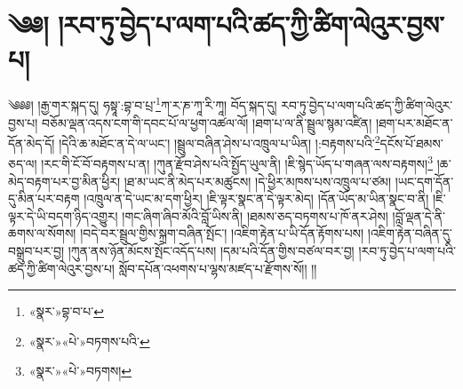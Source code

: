 \chapter{༄༅། །རབ་ཏུ་བྱེད་པ་ལག་པའི་ཚད་ཀྱི་ཚིག་ལེའུར་བྱས་པ།}༄༅༅། །རྒྱ་གར་སྐད་དུ། ཧསྟཱ་:བྷ་བ་པྲ་\footnote{«སྣར་»བྷ་བ་པ་}ཀ་ར་ཎ་ཀཱ་རི་ཀཱ། བོད་སྐད་དུ། རབ་ཏུ་བྱེད་པ་ལག་པའི་ཚད་ཀྱི་ཚིག་ལེའུར་བྱས་པ། བཅོམ་ལྡན་འདས་ངག་གི་དབང་པོ་ལ་ཕྱག་འཚལ་ལོ། །ཐག་པ་ལ་ནི་སྦྲུལ་སྙམ་འཛིན། །ཐག་པར་མཐོང་ན་དོན་མེད་དོ། །དེའི་ཆ་མཐོང་ན་དེ་ལ་ཡང་། །སྦྲུལ་བཞིན་ཤེས་པ་འཁྲུལ་པ་ཡིན། །:བརྟགས་པའི་\footnote{«སྣར་»«པེ་»བཏགས་པའི་}དངོས་པོ་ཐམས་ཅད་ལ། །རང་གི་ངོ་བོ་བརྟགས་པ་ན། །ཀུན་རྫོབ་ཤེས་པའི་སྤྱོད་ཡུལ་ནི། །ཇི་སྙེད་ཡོད་པ་གཞན་ལས་བརྟགས།\footnote{«སྣར་»«པེ་»བཏགས།} །ཆ་མེད་བརྟག་པར་བྱ་མིན་ཕྱིར། །ཐ་མ་ཡང་ནི་མེད་པར་མཚུངས། །དེ་ཕྱིར་མཁས་པས་འཁྲུལ་པ་ཙམ། །ཡང་དག་དོན་དུ་མིན་པར་བརྟག །འཁྲུལ་ན་དེ་ཡང་མ་དག་ཕྱིར། །ཇི་ལྟར་སྣང་ན་དེ་ལྟར་མེད། །དོན་ཡོད་མ་ཡིན་སྣང་བ་ནི། །ཇི་ལྟར་དེ་ཡི་བདག་ཉིད་འགྱུར། །གང་ཞིག་ཞིབ་མོའི་བློ་ཡིས་ནི། །ཐམས་ཅད་བཏགས་པ་ཁོ་ནར་ཤེས། །བློ་ལྡན་དེ་ནི་ཆགས་ལ་སོགས། །བདེ་བར་སྦྲུལ་གྱིས་སྐྲག་བཞིན་སྤོང་། །འཇིག་རྟེན་པ་ཡི་དོན་རྟོགས་པས། །འཇིག་རྟེན་བཞིན་དུ་བསྒྲུབ་པར་བྱ། །ཀུན་ནས་ཉོན་མོངས་སྤོང་འདོད་པས། །དམ་པའི་དོན་གྱིས་བཙལ་བར་བྱ། །རབ་ཏུ་བྱེད་པ་ལག་པའི་ཚད་ཀྱི་ཚིག་ལེའུར་བྱས་པ། སློབ་དཔོན་འཕགས་པ་ལྷས་མཛད་པ་རྫོགས་སོ།། །།